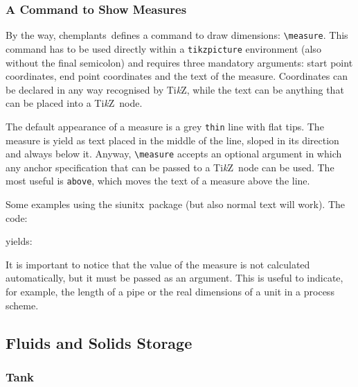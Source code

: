 \documentclass[12pt]{article}						%
\newcommand*{\chemplants}{chemplants}
\newcommand*{\TikZ}{Ti\textit{k}Z}
\newcommand*{\siunitx}{siunitx}
\begin{document}
\subsubsection{A Command to Show Measures}

By the way, \chemplants\ defines a command to draw dimensions: \verb|\measure|.
This command has to be used directly within a \verb|tikzpicture| environment
(also without the final semicolon) and requires three mandatory arguments:
start point coordinates, end point coordinates and the text of the measure.
Coordinates can be declared in any way recognised by \TikZ, while the text can
be anything that can be placed into a \TikZ\ node.

The default appearance of a measure is a grey \verb|thin| line with flat tips.
The measure is yield as text placed in the middle of the line, sloped in its
direction and always below it. Anyway, \verb|\measure| accepts an optional
argument in which any anchor specification that can be passed to a \TikZ\ node
can be used. The most useful is \verb|above|, which moves the text of a measure
above the line.

Some examples using the \siunitx\ package (but also normal text will work).
The code:
\begin{chpcode}
\end{chpcode}
yields:
\begin{center}
\end{center}
It is important to notice that the value of the measure is not calculated
automatically, but it must be passed as an argument. This is useful to indicate,
for example, the length of a pipe or the real dimensions of a unit in a process
scheme.

\subsection{Fluids and Solids Storage}
\label{subsec:storag}

\subsubsection{Tank}
\end{document}
